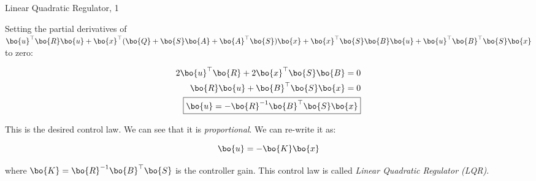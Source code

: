 \documentclass{beamer}
\begin{document}
\begin{frame}{Linear Quadratic Regulator, 1}
\begin{flushleft}


Setting the partial derivatives of $\bo{u}^\top \bo{R} \bo{u}
+ 
\bo{x}^\top (
\bo{Q} + \bo{S} \bo{A} + \bo{A}^\top \bo{S}
)\bo{x}
+ 
\bo{x}^\top \bo{S} \bo{B} \bo{u} 
+ \bo{u}^\top \bo{B}^\top \bo{S} \bo{x}$ to zero:


\begin{align}
2 \bo{u} ^\top \bo{R} + 
2 \bo{x}^\top \bo{S} \bo{B} = 0
\\
\bo{R} \bo{u} + 
 \bo{B}^\top   \bo{S} \bo{x}= 0
 \\
 \boxed{
 \bo{u} = 
 -\bo{R}^{-1} \bo{B}^\top \bo{S} \bo{x}}
\end{align}

This is the desired control law. We can see that it is \emph{proportional}. We can re-write it as:

\begin{equation}
\bo{u} = -\bo{K} \bo{x}
\end{equation}

where $\bo{K}  = \bo{R}^{-1} \bo{B}^\top \bo{S}$ is the controller gain. This control law is called \emph{Linear Quadratic Regulator (LQR)}.

\end{flushleft}
\end{frame}
\end{document}
